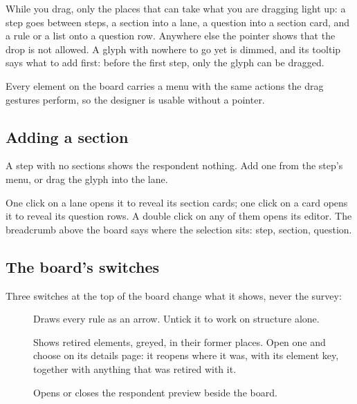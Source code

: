 \documentclass[11pt, a4paper]{article}
\begin{document}
While you drag, only the places that can take what you are dragging light up: a step goes
between steps, a section into a lane, a question into a section card, and a rule or a list onto
a question row. Anywhere else the pointer shows that the drop is not allowed. A glyph with
nowhere to go yet is dimmed, and its tooltip says what to add first: before the first step, only
the  glyph can be dragged.


\begin{elicitnote}
Every element on the board carries a \ui{$\vdots$} menu with the same actions the drag gestures
perform, so the designer is usable without a pointer.
\end{elicitnote}


\subsection{Adding a section}

A step with no sections shows the respondent nothing. Add one from the step's menu, or drag the
 glyph into the lane.


One click on a lane opens it to reveal its section cards; one click on a card opens it to reveal
its question rows. A double click on any of them opens its editor. The breadcrumb above the
board says where the selection sits: step, section, question.

\subsection{The board's switches}

Three switches at the top of the board change what it shows, never the survey:

\begin{description}
  \item[] Draws every rule as an arrow. Untick it to work on structure alone.
  \item[] Shows retired elements, greyed, in their former places. Open one
        and choose  on its details page: it reopens where it was, with its element
        key, together with anything that was retired with it.
  \item[] Opens or closes the respondent preview beside the board.
\end{description}
\end{document}
